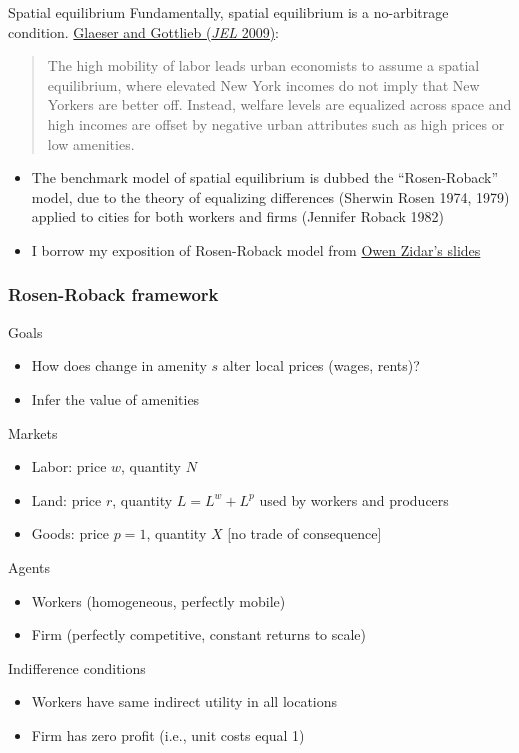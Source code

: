 \documentclass[11pt,notes=hide,aspectratio=169]{beamer}
\begin{document}
\begin{frame}{Spatial equilibrium}
Fundamentally, spatial equilibrium is a no-arbitrage condition.
\href{https://www.aeaweb.org/articles?id=10.1257/jel.47.4.983}{Glaeser and Gottlieb (\textit{JEL} 2009)}:
\begin{quote}
The high mobility of labor leads urban economists to assume a spatial equilibrium, where elevated New York incomes do not imply that New Yorkers are better off. Instead, welfare levels are equalized across space and high incomes are offset by negative urban attributes such as high prices or low amenities.
\end{quote}
\vspace{-4mm}
\begin{itemize}
	\item The benchmark model of spatial equilibrium is dubbed the ``Rosen-Roback'' model, due to the theory of equalizing differences (Sherwin Rosen 1974, 1979) applied to cities for both workers and firms (Jennifer Roback 1982)
	\item I borrow my exposition of Rosen-Roback model from \href{https://scholar.princeton.edu/sites/default/files/zidar/files/zidar_eco524_s2020_lec2.pdf}{Owen Zidar's slides}
\end{itemize}
\end{frame}
\begin{frame}
\frametitle{Rosen-Roback framework}
Goals
\begin{itemize}
\item How does change in amenity $s$ alter local prices (wages, rents)?
\item Infer the value of amenities
\end{itemize}
Markets
\begin{itemize}
\item Labor: price $w$, quantity $N$
\item Land: price $r$, quantity $L=L^w + L^p$ used by workers and producers
\item Goods: price $p=1$, quantity $X$ [no trade of consequence]
\end{itemize}
Agents
\begin{itemize}
\item Workers (homogeneous, perfectly mobile)
\item Firm (perfectly competitive, constant returns to scale)
\end{itemize}
Indifference conditions
\begin{itemize}
\item Workers have same indirect utility in all locations
\item Firm has zero profit (i.e., unit costs equal 1)
\end{itemize}
\end{frame}
\end{document}
